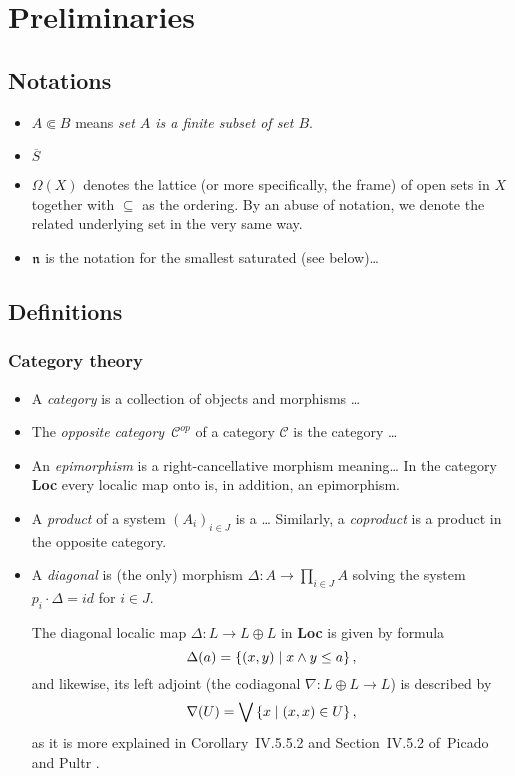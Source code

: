 \chapter*{Preliminaries}

\section*{Notations}

\begin{itemize}
\item $A \Subset B$ means {\sl set $A$ is a finite subset of set $B$\/}.
\item $\overline{S}$ 
\item $\Omega(X)$ denotes the lattice (or more specifically, the frame) of open
sets in $X$ together with $\subseteq$ as the ordering. 
By an abuse of notation, we denote the related underlying set in the very same
way.
\item $\mathfrak{n}$ is the notation for the smallest saturated (see below)\ldots
\end{itemize}

\section*{Definitions}

\subsection*{Category theory}

\begin{itemize}
\item A \emph{category} is a collection of objects and morphisms \ldots
\item The \emph{opposite category}~$\mathcal{C}^{op}$ of a category
$\mathcal{C}$ is the category \ldots
\item An \emph{epimorphism} is a right-cancellative morphism meaning\ldots
In the category {\bf Loc} every localic map onto is, in addition, an
epimorphism.
\item A \emph{product} of a system $\left(A_i\right)_{i\in J}$ is a \ldots
Similarly, a \emph{coproduct} is a product in the opposite category.
\item A \emph{diagonal} is (the only) morphism $\Delta\colon A \to \prod_{i\in
J} A$ solving the system $p_i\cdot \Delta = id$ for $i \in J$.
  \begin{exmpl} \label{(co)diag-in-Loc}
    The diagonal localic map $\Delta\colon L \to L \oplus L$ in {\bf Loc} is
    given by formula
    \[
      \Delta(a) = \left\{ (x, y) \mid x \wedge y \leq a \right\},
    \]
    and likewise, its left adjoint (the codiagonal $\nabla\colon L \oplus L \to
    L$) is described by
    \[
      \nabla(U) = \bigvee \left\{ x \mid (x, x)\in U \right\},
    \]
    as it is more explained in Corollary~IV.5.5.2 and Section~IV.5.2 of~Picado
    and Pultr \cite{picado-pultr12}.
  \end{exmpl}
\end{itemize}


